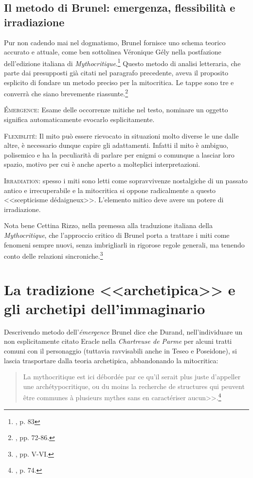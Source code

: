 \documentclass[12pt,a4paper,openright, oneside]{book}
\begin{document}
\subsection{Il metodo di Brunel: emergenza, flessibilità e irradiazione}
Pur non cadendo mai nel dogmatismo, Brunel fornisce uno schema teorico accurato e attuale, come ben sottolinea Véronique Gély nella postfazione dell'edizione italiana di \textit{Mythocritique}.\footnote{\cite{Brunel}, p. 83} Questo metodo di analisi letteraria, che parte dai presupposti già citati nel paragrafo precedente, aveva il proposito esplicito di fondare un metodo preciso per la mitocritica. 
Le tappe sono tre e converrà che siano brevemente riassunte.\footnote{\cite{Brunel1}, pp. 72-86.}

\textsc{\'{E}mergence}: Esame delle occorrenze mitiche nel testo, nominare un oggetto significa automaticamente evocarlo esplicitamente. 

\textsc{Flexiblité}: Il mito può essere rievocato in situazioni molto diverse le une dalle altre, è necessario dunque capire gli adattamenti. Infatti il mito è ambiguo, polisemico e ha la peculiarità di parlare per enigmi o comunque a lasciar loro spazio, motivo per cui è anche aperto a molteplici interpretazioni.

\textsc{Irradiation}: spesso i miti sono letti come sopravvivenze nostalgiche di un passato antico e irrecuperabile e la mitocritica si oppone radicalmente  a questo <<scepticisme dédaigneux>>. L'elemento mitico deve avere un potere di irradiazione.

Nota bene Cettina Rizzo, nella premessa alla traduzione italiana della \textit{Mythocritique}, che l'approccio critico di Brunel porta a trattare i miti come fenomeni sempre nuovi, senza imbrigliarli in rigorose regole generali, ma tenendo conto delle relazioni sincroniche.\footnote{\cite{Brunel}, pp. V-VI.} 

\section{La tradizione <<archetipica>> e gli archetipi dell'immaginario}
Descrivendo metodo dell'\textit{émergence} Brunel dice che Durand, nell'individuare un non esplicitamente citato Eracle nella \textit{Chartreuse de Parme} per alcuni tratti comuni con il personaggio (tuttavia ravvisabili anche in Teseo e Poseidone), si lascia trasportare dalla teoria archetipica, abbandonando la mitocritica: 
\begin{quote}\begin{singlespace}
\footnotesize{
La mythocritique est ici débordée par ce qu'il serait plus juste d'appeller une archétypocritique, ou du moins la recherche de structures qui peuvent \^etre communes à plusieurs mythes sans en caractériser aucun>>.\footnote{\cite{Brunel1}, p. 74.} 
}\end{singlespace}
\end{quote}
\end{document}
